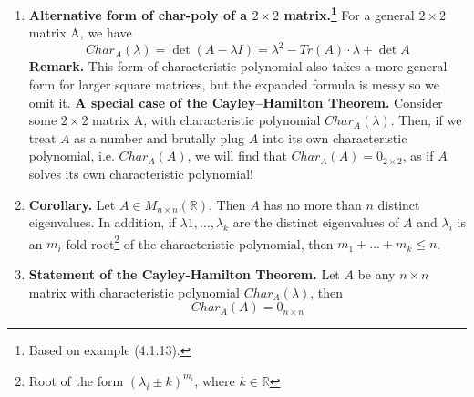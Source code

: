 \documentclass[oneside, 12pt]{book}
\newcommand{\settag}[1]{\renewcommand{\theenumi}{#1}}
\newcommand{\R}{\mathbb{R}}
\newcommand{\tbf}[1]{\textbf{#1}}
\newcommand{\mat}[2]{M_{#1 \times #2}(\R)}
\newcommand{\para}[1]{\item \tbf{#1}}
\begin{document}
\begin{enumerate}
    \settag{4.1.13}
    \para{Alternative form of char-poly of a $2 \times 2$ matrix.\footnote{Based on example (4.1.13).}} For a general $2\times 2$ matrix A, we have
    \begin{equation*}
        Char_A(\lambda)= \det(A-\lambda I) = \lambda^2 - Tr(A)\cdot\lambda + \det{A} 
    \end{equation*}
    \textbf{Remark.} This form of characteristic polynomial also takes a more general form for larger square matrices, but the expanded formula is messy so we omit it. \newline
    \textbf{A special case of the Cayley–Hamilton Theorem.} Consider some $2\times 2$ matrix A, with characteristic polynomial $Char_A(\lambda)$. Then, if we treat $A$ as a number and brutally plug $A$ into its own characteristic polynomial, i.e. $Char_A(A)$, we will find that $Char_A(A) = 0_{2 \times 2}$, as if $A$ solves its own characteristic polynomial!
    
    \settag{4.1.14}
    \para{Corollary.} Let $A\in \mat{n}{n}$. Then $A$ has no more than $n$ distinct eigenvalues. In addition, if $\lambda1,...,\lambda_k$ are the distinct eigenvalues of $A$ and $\lambda_i$ is an $m_i$-fold root\footnote{Root of the form $(\lambda_i \pm k)^{m_i}$, where $k \in \R$} of the characteristic polynomial, then $m_1+...+m_k \leq n$.
    
    \settag{4.1.18}
    \para{Statement of the Cayley-Hamilton Theorem.} Let $A$ be any $n\times n$ matrix with characteristic polynomial $Char_A(\lambda)$, then
    \begin{equation*}
        Char_A(A) = 0_{n \times n}
    \end{equation*}
\end{enumerate}
\end{document}
